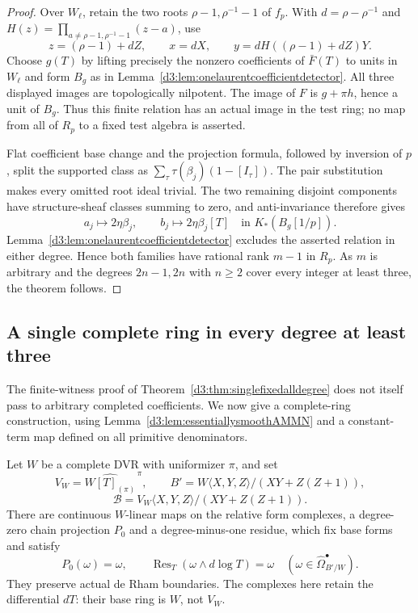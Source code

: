 \begin{proof}
Over $W_\ell$, retain the two roots
$\rho-1,\rho^{-1}-1$ of $f_p$.
With $d=\rho-\rho^{-1}$ and
$H(z)=\prod_{a\ne\rho-1,\rho^{-1}-1}(z-a)$, use
\[
 z=(\rho-1)+dZ,\qquad x=dX,\qquad
 y=dH((\rho-1)+dZ)Y.
\]
Choose $g(T)$ by lifting precisely the nonzero coefficients of
$\bar F(T)$ to units in $W_\ell$ and form $B_g$ as in
Lemma~\ref{d3:lem:onelaurentcoefficientdetector}.
All three displayed images are topologically nilpotent.
The image of $F$ is $g+\pi h$, hence a unit of $B_g$.
Thus this finite relation has an actual image in the test ring;
no map from all of $R_p$ to a fixed test algebra is asserted.

Flat coefficient base change and the projection formula, followed
by inversion of $p$, split the supported class as
$\sum_\tau\tau(\beta_j)(1-[I_\tau])$.
The pair substitution makes every omitted root ideal trivial.
The two remaining disjoint components have structure-sheaf
classes summing to zero, and anti-invariance therefore gives
\[
 a_j\longmapsto2\eta\beta_j,\qquad
 b_j\longmapsto2\eta\beta_j[T]
 \quad\text{in }K_*(B_g[1/p]).
\]
Lemma~\ref{d3:lem:onelaurentcoefficientdetector} excludes the asserted
relation in either degree.
Hence both families have rational rank $m-1$ in $R_p$.
As $m$ is arbitrary and the degrees $2n-1,2n$ with $n\geq2$
cover every integer at least three, the theorem follows.
\end{proof}


\subsection{A single complete ring in every degree at least three}
\label{d3:sec:completedfixedalldegree}

The finite-witness proof of Theorem~\ref{d3:thm:singlefixedalldegree}
does not itself pass to arbitrary completed coefficients.  We now
give a complete-ring construction, using
Lemma~\ref{d3:lem:essentiallysmoothAMMN} and a constant-term map
defined on all primitive denominators.

\begin{lemma}
\label{d3:lem:completedcoefficientresidue}
Let $W$ be a complete DVR with uniformizer $\pi$, and set
\[
 V_W=\widehat{W[T]_{(\pi)}}^{\,\pi},\qquad
 B'=W\langle X,Y,Z\rangle/(XY+Z(Z+1)),
\]
\[
 \mathcal B=V_W\langle X,Y,Z\rangle/(XY+Z(Z+1)).
\]
There are continuous $W$-linear maps on the relative form complexes,
a degree-zero chain projection $P_0$ and a degree-minus-one residue,
which fix base forms and satisfy
\[
 P_0(\omega)=\omega,\qquad
 \operatorname{Res}_T(\omega\wedge d\log T)=\omega
 \quad(\omega\in\widehat\Omega^\bullet_{B'/W}).
\]
They preserve actual de Rham boundaries. The complexes here retain
the differential $dT$: their base ring is $W$, not $V_W$.
\end{lemma}

